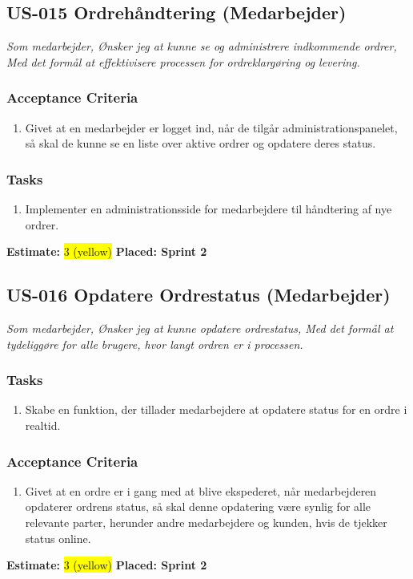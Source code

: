 \subsection{US-015 Ordrehåndtering (Medarbejder)}
\label{sec:US-015}
\textit{Som medarbejder, Ønsker jeg at kunne se og administrere indkommende ordrer, Med det formål at effektivisere processen for ordreklargøring og levering.}
\subsubsection*{\textbf{Acceptance Criteria}}
\begin{enumerate}
  \item Givet at en medarbejder er logget ind, når de tilgår administrationspanelet, så skal de kunne se en liste over aktive ordrer og opdatere deres status.
\end{enumerate}
\subsubsection*{\textbf{Tasks}}
\begin{enumerate}
  \item Implementer en administrationsside for medarbejdere til håndtering af nye ordrer.
\end{enumerate}
\textbf{Estimate:} \colorbox{yellow}{3 (yellow)}
\textbf{Placed: Sprint 2}
\par\noindent\dotfill

\subsection{US-016 Opdatere Ordrestatus (Medarbejder)}
\label{sec:US-016}
\textit{Som medarbejder, Ønsker jeg at kunne opdatere ordrestatus, Med det formål at tydeliggøre for alle brugere, hvor langt ordren er i processen.}
\subsubsection*{\textbf{Tasks}}
\begin{enumerate}
  \item Skabe en funktion, der tillader medarbejdere at opdatere status for en ordre i realtid.
\end{enumerate}
\subsubsection*{\textbf{Acceptance Criteria}}
\begin{enumerate}
  \item Givet at en ordre er i gang med at blive ekspederet, når medarbejderen opdaterer ordrens status, så skal denne opdatering være synlig for alle relevante parter, herunder andre medarbejdere og kunden, hvis de tjekker status online.
\end{enumerate}
\textbf{Estimate:} \colorbox{yellow}{3 (yellow)}
\textbf{Placed: Sprint 2}
\par\noindent\dotfill

